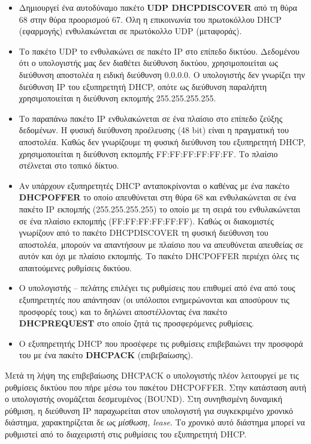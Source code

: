 \begin{itemize}
\item Δημιουργεί ένα αυτοδύναμο πακέτο \textbf{UDP DHCPDISCOVER} από τη θύρα 68 στην θύρα προορισμού 67. Όλη η επικοινωνία του πρωτοκόλλου DHCP (εφαρμογής) ενθυλακώνεται σε πρωτόκολλο UDP (μεταφοράς).
\item Το πακέτο UDP το ενθυλακώνει σε πακέτο IP στο επίπεδο δικτύου. Δεδομένου ότι ο υπολογιστής μας δεν διαθέτει διεύθυνση δικτύου, χρησιμοποιείται ως διεύθυνση αποστολέα η ειδική διεύθυνση 0.0.0.0. Ο υπολογιστής δεν γνωρίζει την διεύθυνση IP του εξυπηρετητή DHCP, οπότε ως διεύθυνση παραλήπτη χρησιμοποιείται η διεύθυνση εκπομπής 255.255.255.255.
\item Το παραπάνω πακέτο IP ενθυλακώνεται σε ένα πλαίσιο στο επίπεδο ζεύξης δεδομένων. Η φυσική διεύθυνση προέλευσης (48 bit) είναι η πραγματική του αποστολέα. Καθώς δεν γνωρίζουμε τη φυσική διεύθυνση του εξυπηρετητή DHCP, χρησιμοποιείται η διεύθυνση εκπομπής FF:FF:FF:FF:FF:FF. Το πλαίσιο στέλνεται στο τοπικό δίκτυο. 
\item Αν υπάρχουν εξυπηρετητές DHCP ανταποκρίνονται  ο καθένας με ένα πακέτο \textbf{DHCPOFFER} το οποίο απευθύνεται στη θύρα 68 και ενθυλακώνεται σε ένα πακέτο IP εκπομπής (255.255.255.255) το οποίο με τη σειρά του ενθυλακώνεται σε ένα πλαίσιο εκπομπής (FF:FF:FF:FF:FF:FF).  Καθώς οι διακομιστές γνωρίζουν από το πακέτο DHCPDISCOVER τη φυσική διεύθυνση του αποστολέα, μπορούν να απαντήσουν με πλαίσιο που να απευθύνεται απευθείας σε αυτόν και όχι με πλαίσιο εκπομπής. Το πακέτο DHCPOFFER περιέχει όλες τις απαιτούμενες ρυθμίσεις δικτύου.
\item  Ο υπολογιστής -- πελάτης επιλέγει τις ρυθμίσεις που επιθυμεί από ένα από τους εξυπηρετητές που απάντησαν (οι υπόλοιποι ενημερώνονται και αποσύρουν τις προσφορές τους) και το δηλώνει αποστέλλοντας ένα πακέτο\\ \textbf{DHCPREQUEST} στο οποίο ζητά τις προσφερόμενες ρυθμίσεις.
\item Ο εξυπηρετητής DHCP που προσέφερε τις ρυθμίσεις επιβεβαιώνει την προσφορά του με ένα πακέτο \textbf{DHCPACK} (επιβεβαίωσης).
\end{itemize}

Μετά τη λήψη της επιβεβαίωσης DHCPACK ο υπολογιστής πλέον λειτουργεί με τις ρυθμίσεις δικτύου που πήρε μέσω του πακέτου DHCPOFFER. Στην κατάσταση αυτή ο υπολογιστής ονομάζεται δεσμευμένος (BOUND). Στη συνηθισμένη δυναμική ρύθμιση, η διεύθυνση IP παραχωρείται στον υπολογιστή για συγκεκριμένο χρονικό διάστημα, χαρακτηρίζεται δε ως \emph{μίσθωση, lease}. Το χρονικό αυτό διάστημα μπορεί να ρυθμιστεί από το διαχειριστή στις ρυθμίσεις του εξυπηρετητή DHCP.

